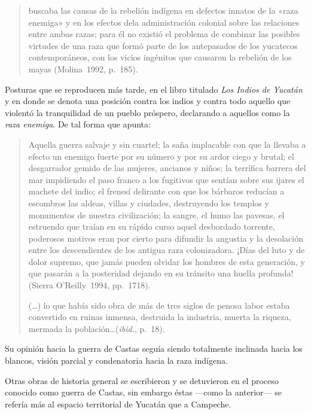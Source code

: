 \begin{quotation}
buscaba las causas de la rebelión indígena en defectos innatos de la 
«raza enemiga» y en los efectos dela administración colonial sobre las
relaciones entre ambas razas; para él no existió el problema de combinar
las posibles virtudes de una raza que formó parte de los antepasados de los
yucatecos contemporáneos, con los vicios ingénitos que causaron la rebelión
de los mayas (Molina~1992, p.~185).
\end{quotation}

\medskip
Posturas que se reproducen más tarde,  en el libro titulado \textit{Los
Indios de Yucatán} y en donde se denota una posición contra los indios y
contra todo aquello que violentó la tranquilidad de un pueblo próspero, 
declarando a aquellos como la \textit{raza enemiga}. De tal forma que
apunta:
\enlargethispage{1\baselineskip}

\begin{quotation}
Aquella guerra salvaje y sin cuartel; la saña implacable con que la llevaba
a efecto un enemigo fuerte por su número y por su ardor ciego y brutal; el
desgarrador gemido de las mujeres, ancianos y niños; la terrífica barrera
del mar impidiendo el paso franco a los fugitivos que sentían sobre sus
ijares el machete del indio; el frenesí delirante con que los bárbaros
reducían a escombros las aldeas, villas y ciudades, destruyendo los templos
y monumentos de nuestra civilización; la sangre, el humo las pavesas, el
estruendo que traían en su rápido curso aquel desbordado torrente,
poderosos motivos eran por cierto para difundir la angustia y la desolación
entre los descendientes de los antigua raza colonizadora. ¡Días del luto y
de dolor supremo, que jamás pueden olvidar los hombres de esta generación,
y que pasarán a la posteridad dejando en su tránsito una huella profunda!\linebreak
(Sierra O’Reilly~1994, pp.~17\textendash{}18).
 
(\ldots) lo que había sido obra de más de tres siglos de penosa labor estaba
convertido en ruinas inmensa, destruida la industria, muerta la riqueza,
mermada la población\ldots (\textit{ibid.}, p.~18).
\end{quotation}

Su opinión hacia la guerra de Castas seguía siendo totalmente inclinada
hacia los blancos, visión parcial y condenatoria hacia la raza indígena.

Otras obras de historia general se escribieron y se detuvieron en el proceso
conocido como guerra de Castas, sin embargo éstas ---como la anterior--- se
refería más al espacio territorial de Yucatán que a Campeche.


